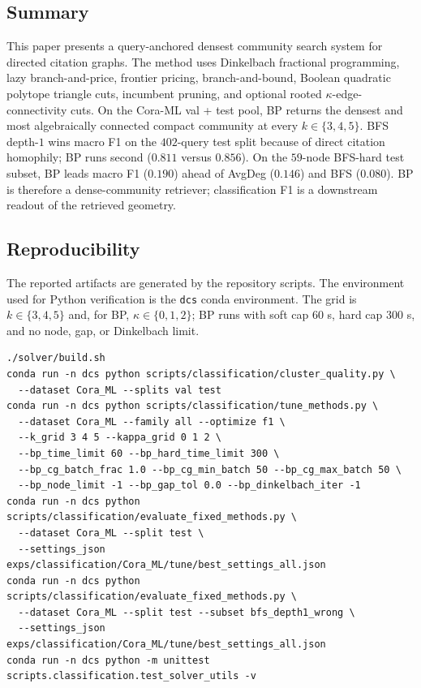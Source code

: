 \documentclass[11pt]{article}
\begin{document}
\subsection{Summary}

This paper presents a query-anchored densest community search system for
directed citation graphs. The method uses Dinkelbach fractional
programming, lazy branch-and-price, frontier pricing, branch-and-bound,
Boolean quadratic polytope triangle cuts, incumbent pruning, and optional
rooted $\kappa$-edge-connectivity cuts. On the Cora-ML val + test pool,
BP returns the densest and most algebraically connected compact community
at every $k \in \{3, 4, 5\}$. BFS depth-$1$ wins macro F1 on the
$402$-query test split because of direct citation homophily; BP runs
second ($0.811$ versus $0.856$). On the $59$-node BFS-hard test subset,
BP leads macro F1 ($0.190$) ahead of AvgDeg ($0.146$) and BFS ($0.080$).
BP is therefore a dense-community retriever; classification F1 is a
downstream readout of the retrieved geometry.

\subsection*{Reproducibility}

The reported artifacts are generated by the repository scripts. The
environment used for Python verification is the \texttt{dcs} conda
environment. The grid is $k \in \{3, 4, 5\}$ and, for BP,
$\kappa \in \{0, 1, 2\}$; BP runs with soft cap $60$ s, hard cap
$300$ s, and no node, gap, or Dinkelbach limit.

\begin{verbatim}
./solver/build.sh
conda run -n dcs python scripts/classification/cluster_quality.py \
  --dataset Cora_ML --splits val test
conda run -n dcs python scripts/classification/tune_methods.py \
  --dataset Cora_ML --family all --optimize f1 \
  --k_grid 3 4 5 --kappa_grid 0 1 2 \
  --bp_time_limit 60 --bp_hard_time_limit 300 \
  --bp_cg_batch_frac 1.0 --bp_cg_min_batch 50 --bp_cg_max_batch 50 \
  --bp_node_limit -1 --bp_gap_tol 0.0 --bp_dinkelbach_iter -1
conda run -n dcs python scripts/classification/evaluate_fixed_methods.py \
  --dataset Cora_ML --split test \
  --settings_json exps/classification/Cora_ML/tune/best_settings_all.json
conda run -n dcs python scripts/classification/evaluate_fixed_methods.py \
  --dataset Cora_ML --split test --subset bfs_depth1_wrong \
  --settings_json exps/classification/Cora_ML/tune/best_settings_all.json
conda run -n dcs python -m unittest scripts.classification.test_solver_utils -v
\end{verbatim}
\end{document}
